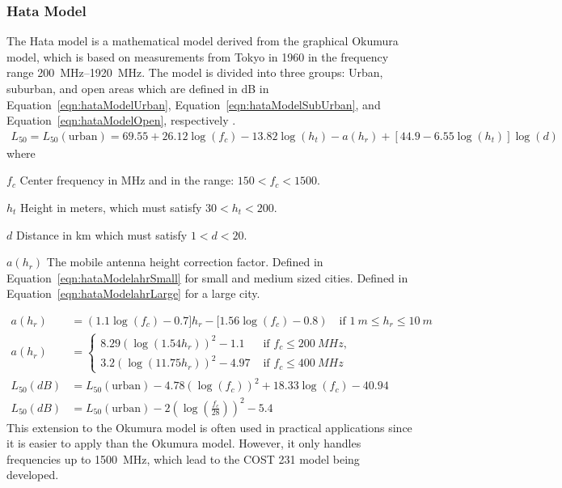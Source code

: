 \subsubsection{Hata Model}
The Hata model is a mathematical model derived from the graphical Okumura model, which is based on measurements from Tokyo in 1960 in the frequency range \SIrange{200}{1920}{MHz}. The model is divided into three groups: Urban, suburban, and open areas which are defined in dB in Equation~\ref{eqn:hataModelUrban}, Equation~\ref{eqn:hataModelSubUrban}, and Equation~\ref{eqn:hataModelOpen}, respectively \cite{Seybold2005introduction}.
\begin{align} %
    \label{eqn:hataModelUrban}
    L_{50} = L_{50}(\text{urban}) = 69.55+26.12 \log(f_c) - 13.82 \log(h_t) -a(h_r) + [44.9-6.55 \log(h_t)] \log(d)
\end{align} 
where
\begin{where}
\item [$f_{c}$] Center frequency in \si{MHz} and in the range: $150 < f_c < 1500$.
\item [$h_t$] Height in meters, which must satisfy $30 < h_t < 200$.
\item [$d$] Distance in km which must satisfy $1 < d < 20$.
\item [$a(h_r)$] The mobile antenna height correction factor. Defined in Equation~\ref{eqn:hataModelahrSmall} \cite{Seybold2005introduction} for small and medium sized cities. Defined in Equation~\ref{eqn:hataModelahrLarge} \cite{Seybold2005introduction} for a large city. 
\end{where}
\begin{align} %
\label{eqn:hataModelahrSmall}
a(h_r) &= (1.1 \log(f_c)-0.7]h_r - [1.56 \log(f_c)-0.8)\quad\text{if } \SI{1}{m} \leq h_r \leq \SI{10}{m} \\
\label{eqn:hataModelahrLarge}
a(h_r) &= 
  \begin{cases}
    8.29(\log(1.54 h_r))^2 -1.1 & \text{ if } f_c \leq \SI{200}{MHz}, \\
    3.2(\log(11.75 h_r))^2 -4.97 & \text{ if } f_c \leq \SI{400}{MHz} 
  \end{cases}\\
\label{eqn:hataModelSubUrban}
L_{50}(dB) &= L_{50}(\text{urban})-4.78(\log(f_c))^2 + 18.33 \log(f_c) - 40.94 \\
\label{eqn:hataModelOpen}
L_{50}(dB) &= L_{50}(\text{urban})-2 \left(\log\left( \frac{f_c}{28} \right) \right)^2 -5.4 
\end{align} 
This extension to the Okumura model is often used in practical applications since it is easier to apply than the Okumura model. However, it only handles frequencies up to \SI{1500}{MHz}, which lead to the COST 231 model being developed.

